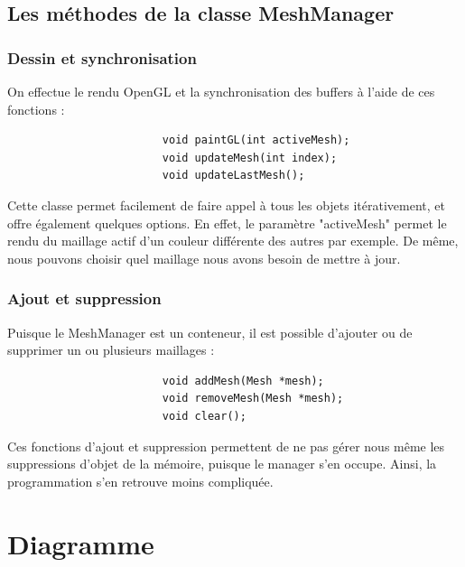 \documentclass[a4paper]{memoir}
\begin{document}
			\subsection{Les méthodes de la classe MeshManager}
				\label{manager-dev}
				\subsubsection{Dessin et synchronisation}
					On effectue le rendu OpenGL et la synchronisation des buffers à l'aide de ces fonctions :
					\begin{verbatim}
						void paintGL(int activeMesh);
						void updateMesh(int index);
						void updateLastMesh();
					\end{verbatim}
					Cette classe permet facilement de faire appel à tous les objets itérativement, et offre également quelques options. En effet, le 
					paramètre "activeMesh" permet le rendu du maillage actif d'un couleur différente des autres par exemple. De même, nous pouvons choisir 
					quel maillage nous avons besoin de mettre à jour.
					
				\subsubsection{Ajout et suppression}
					Puisque le MeshManager est un conteneur, il est possible d'ajouter ou de supprimer un ou plusieurs maillages :
					\begin{verbatim}
						void addMesh(Mesh *mesh);
						void removeMesh(Mesh *mesh);
						void clear();
					\end{verbatim}
					Ces fonctions d'ajout et suppression permettent de ne pas gérer nous même les suppressions d'objet de la mémoire, puisque le manager 
					s'en occupe. Ainsi, la programmation s'en retrouve moins compliquée.
		
		\section{Diagramme}
\end{document}
